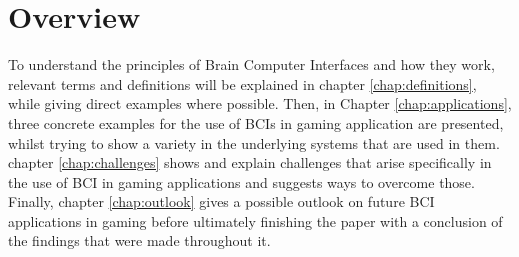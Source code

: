 


\section{Overview}


To understand the principles of Brain Computer Interfaces and how they work, relevant terms and definitions will be explained in chapter \ref{chap:definitions}, while giving direct examples where possible.
Then, in Chapter \ref{chap:applications}, three concrete examples for the use of BCIs in gaming application are presented, whilst trying to show a variety in the underlying systems that are used in them. chapter \ref{chap:challenges} shows and explain challenges that arise specifically in the use of BCI in gaming applications and suggests ways to overcome those. Finally, chapter \ref{chap:outlook} gives a possible outlook on future BCI applications in gaming before ultimately finishing the paper with a conclusion of the findings that were made throughout it.  